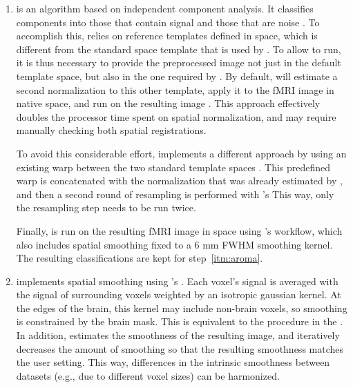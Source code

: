 \begin{enumerate}[leftmargin=*]

\item

 is an algorithm based on independent component analysis. It classifies components into those that contain signal and those that are noise \parencite{pruim2015}. To accomplish this,  relies on reference templates defined in  space, which is different from the standard space template  that is used by . To allow  to run, it is thus necessary to provide the preprocessed image not just in the default template space, but also in the one required by . By default,  will estimate a second normalization to this other template, apply it to the fMRI image in native space, and run  on the resulting image \parencite{ciric2021}. This approach effectively doubles the processor time spent on spatial normalization, and may require manually checking both spatial registrations.

To avoid this considerable effort,  implements a different approach by using an existing warp between the two standard template spaces \parencite{horn2016c}. This predefined warp is concatenated with the normalization that was already estimated by , and then a second round of resampling is performed with 's  This way, only the resampling step needs to be run twice.

Finally,  is run on the resulting fMRI image in  space using 's  workflow, which also includes spatial smoothing fixed to a 6 mm FWHM smoothing kernel. The resulting classifications are kept for step~\ref{itm:aroma}.

\item

 implements spatial smoothing using 's  \parencite{friedman2006}. Each voxel's signal is averaged with the signal of surrounding voxels weighted by an isotropic gaussian kernel. At the edges of the brain, this kernel may include non-brain voxels, so smoothing is constrained by the brain mask. This is equivalent to the procedure in the  \parencite{glasser2013}. In addition,  estimates the smoothness of the resulting image, and iteratively decreases the amount of smoothing so that the resulting smoothness matches the user setting. This way, differences in the intrinsic smoothness between datasets (e.g., due to different voxel sizes) can be harmonized.


\end{enumerate}

